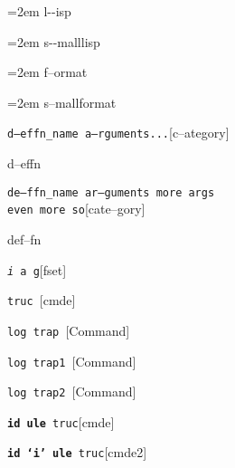 \documentclass{book}
\begin{document}
\begin{titlepage}
\par\begingroup\obeylines\obeyspaces\frenchspacing\leftskip=2em\relax\parskip=0pt\relax\ttfamily{}%
l{-}{-}isp
\endgroup{}%

\par\begingroup\obeylines\obeyspaces\frenchspacing\leftskip=2em\relax\parskip=0pt\relax\ttfamily\footnotesize{}%
s{-}{-}malllisp
\endgroup{}%

\par\begingroup\obeylines\obeyspaces\frenchspacing\leftskip=2em\relax\parskip=0pt\relax{}%
f--ormat
\endgroup{}%

\par\begingroup\obeylines\obeyspaces\frenchspacing\leftskip=2em\relax\parskip=0pt\relax\footnotesize{}%
s--mallformat
\endgroup{}%

\noindent\texttt\bgroup{}d--effn\_name a--rguments...\egroup{}\hfill[c--ategory]



%
d--effn

\noindent\texttt\bgroup{}de--ffn\_name ar--guments    more args \leavevmode{}\\ even more so\egroup{}\hfill[cate--gory]



%
def--fn

\noindent\texttt\bgroup{}\emph{i} a g\egroup{}\hfill[fset]



%
%
\noindent\texttt\bgroup{}truc \egroup{}\hfill[cmde]



%
\noindent\texttt\bgroup{}log trap \egroup{}\hfill[Command]



%
\noindent\texttt\bgroup{}log trap1 \egroup{}\hfill[Command]



%
\noindent\texttt\bgroup{}log trap2 \egroup{}\hfill[Command]



%
\noindent\texttt\bgroup{}\textbf{id ule} truc\egroup{}\hfill[cmde]



%
\noindent\texttt\bgroup{}\textbf{id `\texttt{i}' ule} truc\egroup{}\hfill[cmde2]




\end{titlepage}
\end{document}

